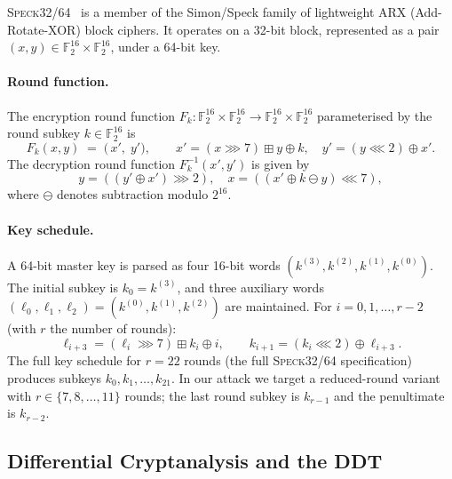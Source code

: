\documentclass[runningheads]{llncs}
\newcommand{\speck}{\textsc{Speck}32/64}
\newcommand{\xor}{\oplus}
\newcommand{\ror}[2]{(#1 \ggg #2)}
\newcommand{\rol}[2]{(#1 \lll #2)}
\begin{document}
\speck{}~\cite{BRRSSST13} is a member of the Simon/Speck family of
lightweight ARX (Add-Rotate-XOR) block ciphers.  It operates on a
32-bit block, represented as a pair $(x, y) \in \mathbb{F}_2^{16} \times
\mathbb{F}_2^{16}$, under a 64-bit key.

\paragraph{Round function.}
The encryption round function $F_k : \mathbb{F}_2^{16} \times
\mathbb{F}_2^{16} \to \mathbb{F}_2^{16} \times \mathbb{F}_2^{16}$
parameterised by the round subkey $k \in \mathbb{F}_2^{16}$ is
\begin{equation}
  \label{eq:round}
  F_k(x, y) \;=\;
  \bigl(\,x' ,\; y'\bigr),
  \qquad
  x' = \ror{x}{7} \boxplus y \xor k, \quad
  y' = \rol{y}{2} \xor x'.
\end{equation}
The decryption round function $F_k^{-1}(x', y')$ is given by
\begin{equation}
  \label{eq:dec-round}
  y = \ror{(y' \xor x')}{2}, \quad
  x = \rol{(x' \xor k \ominus y)}{7},
\end{equation}
where $\ominus$ denotes subtraction modulo $2^{16}$.

\paragraph{Key schedule.}
A 64-bit master key is parsed as four 16-bit words
$(k^{(3)}, k^{(2)}, k^{(1)}, k^{(0)})$.
The initial subkey is $k_0 = k^{(3)}$, and three auxiliary words
$(\ell_0, \ell_1, \ell_2) = (k^{(0)}, k^{(1)}, k^{(2)})$ are maintained.
For $i = 0, 1, \ldots, r-2$ (with $r$ the number of rounds):
\begin{equation}
  \label{eq:keyschedule}
  \ell_{i+3} = \ror{\ell_{i}}{7} \boxplus k_i \xor i, \qquad
  k_{i+1}    = \rol{k_i}{2} \xor \ell_{i+3}.
\end{equation}
The full key schedule for $r = 22$ rounds (the full \speck{} specification)
produces subkeys $k_0, k_1, \ldots, k_{21}$.
In our attack we target a reduced-round variant with $r \in \{7, 8, \ldots, 11\}$
rounds; the last round subkey is $k_{r-1}$ and the penultimate is $k_{r-2}$.

\subsection{Differential Cryptanalysis and the DDT}
\end{document}
